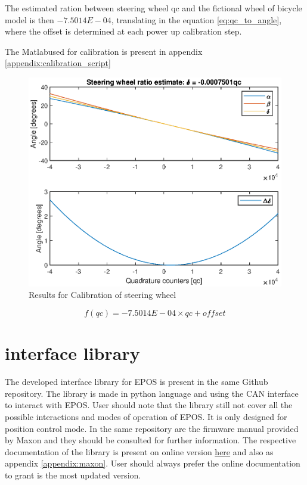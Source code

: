 The estimated ration between steering wheel \gls{qc} and the fictional wheel of bicycle model is then $-7.5014E-04$, translating in the equation \eqref{eq:qc_to_angle}, where the offset is determined at each power up calibration step. 

The Matlab\texttrademark used for calibration is present in appendix \ref{appendix:calibration_script}

\begin{figure}[!hb]
	\centering
	\includegraphics[width=0.7\linewidth]{figures/Steering_calibration_results.eps}
	\caption{Results for Calibration of steering wheel}
	\label{fig:calibration_results}
\end{figure}

\begin{equation}
f(qc) = -7.5014E-04 \times qc + offset
\label{eq:qc_to_angle}
\end{equation}


\section{interface library}

The developed interface library for \gls{EPOS} is present in the same Github repository. The library is made in python language and using the CAN interface to interact with \gls{EPOS}. User should note that the library still not cover all the possible interactions and modes of operation of \gls{EPOS}. It is only designed for position control mode. In the same repository are the firmware manual provided by Maxon and they should be consulted for further information. The respective documentation of the library is present on online version \href{https://maxon-epos-canopen.readthedocs.io/en/latest/}{here} and also as appendix \ref{appendix:maxon}. User should always prefer the online documentation to grant is the most updated version.



